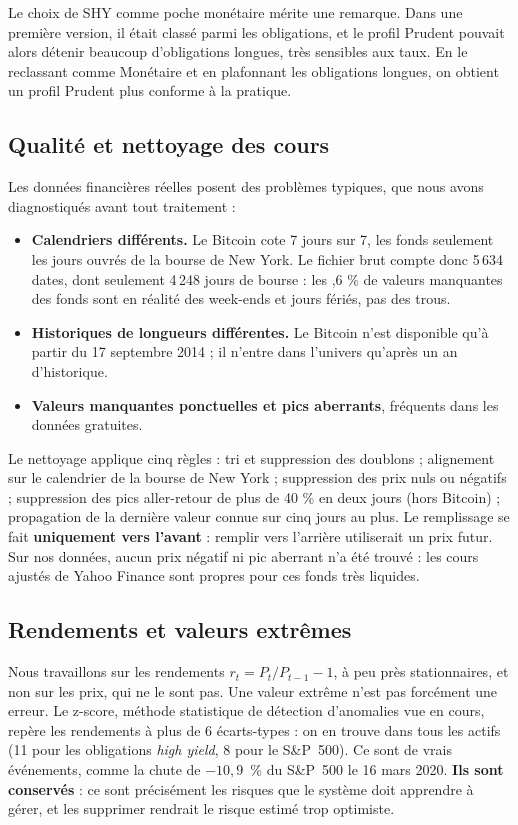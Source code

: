 Le choix de SHY comme poche monétaire mérite une remarque. Dans une première version, il était classé parmi les obligations, et le profil Prudent pouvait alors détenir beaucoup d'obligations longues, très sensibles aux taux. En le reclassant comme \og Monétaire \fg{} et en plafonnant les obligations longues, on obtient un profil Prudent plus conforme à la pratique.

\subsection{Qualité et nettoyage des cours}

Les données financières réelles posent des problèmes typiques, que nous avons diagnostiqués avant tout traitement :
\begin{itemize}
  \item \textbf{Calendriers différents.} Le Bitcoin cote 7 jours sur 7, les fonds seulement les jours ouvrés de la bourse de New York. Le fichier brut compte donc 5\,634 dates, dont seulement 4\,248 jours de bourse : les ,6 \% de valeurs manquantes \fg{} des fonds sont en réalité des week-ends et jours fériés, pas des trous.
  \item \textbf{Historiques de longueurs différentes.} Le Bitcoin n'est disponible qu'à partir du 17 septembre 2014 ; il n'entre dans l'univers qu'après un an d'historique.
  \item \textbf{Valeurs manquantes ponctuelles et pics aberrants}, fréquents dans les données gratuites.
\end{itemize}

Le nettoyage applique cinq règles : tri et suppression des doublons ; alignement sur le calendrier de la bourse de New York ; suppression des prix nuls ou négatifs ; suppression des pics \og aller-retour \fg{} de plus de 40 \% en deux jours (hors Bitcoin) ; propagation de la dernière valeur connue sur cinq jours au plus. Le remplissage se fait \textbf{uniquement vers l'avant} : remplir vers l'arrière utiliserait un prix futur. Sur nos données, aucun prix négatif ni pic aberrant n'a été trouvé : les cours ajustés de Yahoo Finance sont propres pour ces fonds très liquides.

\subsection{Rendements et valeurs extrêmes}

Nous travaillons sur les rendements $r_t = P_t/P_{t-1}-1$, à peu près stationnaires, et non sur les prix, qui ne le sont pas. Une valeur extrême n'est pas forcément une erreur. Le z-score, méthode statistique de détection d'anomalies vue en cours, repère les rendements à plus de 6 écarts-types : on en trouve dans tous les actifs (11 pour les obligations \emph{high yield}, 8 pour le S\&P~500). Ce sont de vrais événements, comme la chute de $-10{,}9$~\% du S\&P~500 le 16 mars 2020. \textbf{Ils sont conservés} : ce sont précisément les risques que le système doit apprendre à gérer, et les supprimer rendrait le risque estimé trop optimiste.

